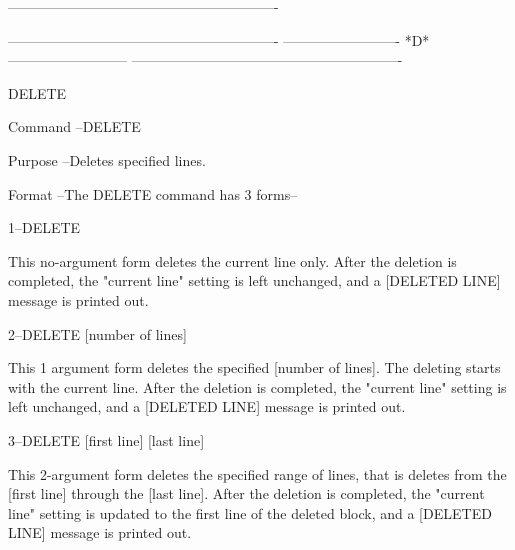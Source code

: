 ----------------------------------------------------------
 
 
 
 
 
 
 
 
 
 
 
 
 
 
 
 
 
 
 
 
 
 
 
 
 
 
 
 
 
 
 
 
 
 
 
 
 
 
 
 
 
 
 
 
 
 
 
 
----------------------------------------------------------
-------------------------  *D*  --------------------------
----------------------------------------------------------
 
DELETE
 
Command --DELETE
 
Purpose --Deletes specified lines.
 
Format  --The DELETE command has 3 forms--
 
       1--DELETE
 
          This no-argument form deletes the
          current line only.
          After the deletion is completed, the
          "current line" setting is left unchanged,
          and a    [DELETED LINE]   message is
          printed out.
 
       2--DELETE [number of lines]
 
          This 1 argument form deletes the specified
          [number of lines].  The deleting starts with
          the current line.
          After the deletion is completed, the
          "current line" setting is left unchanged,
          and a    [DELETED LINE]   message is
          printed out.
 
       3--DELETE [first line] [last line]
 
          This 2-argument form deletes the specified
          range of lines, that is deletes from the
          [first line]     through the     [last line].
          After the deletion is completed, the
          "current line" setting is updated to
          the first line of the deleted block,
          and a    [DELETED LINE]   message is
          printed out.
 
